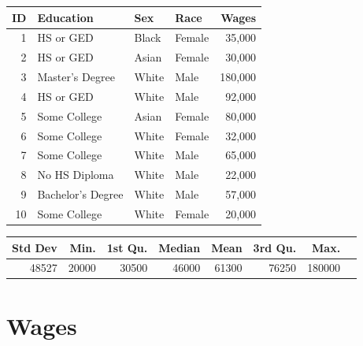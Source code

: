 \documentclass{exam}
\begin{document}
  \begin{table}[H]
    \centering
    \begin{tabular}{rlllr}
      \toprule
        ID & Education         & Sex   & Race   & Wages \\
      \midrule
         1 & HS or GED         & Black & Female & 35,000 \\
         2 & HS or GED         & Asian & Female & 30,000 \\
         3 & Master's Degree   & White & Male   & 180,000 \\
         4 & HS or GED         & White & Male   & 92,000 \\
         5 & Some College      & Asian & Female & 80,000 \\
         6 & Some College      & White & Female & 32,000 \\
         7 & Some College      & White & Male   & 65,000 \\
         8 & No HS Diploma     & White & Male   & 22,000 \\
         9 & Bachelor's Degree & White & Male   & 57,000 \\
        10 & Some College      & White & Female & 20,000 \\
      \bottomrule
    \end{tabular}
  \end{table}

  \begin{table}[ht]
    \centering
    \begin{tabular}{rrrrrrrr}
      \toprule
        Std Dev & Min.  & 1st Qu. & Median & Mean  & 3rd Qu. & Max. \\
      \midrule
        48527   & 20000 & 30500   & 46000  & 61300 & 76250   & 180000 \\
      \bottomrule
    \end{tabular}
  \end{table}

  \section{Wages}
\end{document}
